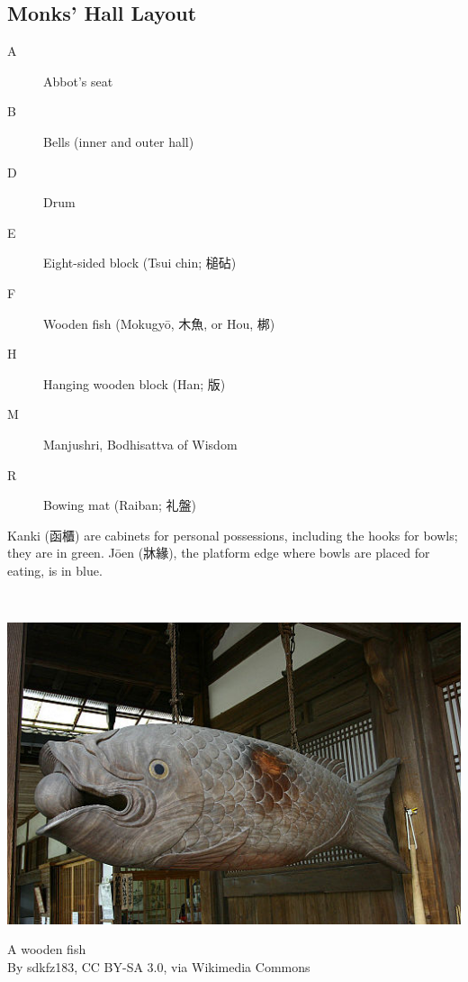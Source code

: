 \documentclass{article}
\begin{document}
\begin{multicols}{4}

\section{Monks' Hall Layout}

\begin{description}
\item[A] Abbot's seat
\item[B] Bells (inner and outer hall)
\item[D] Drum
\item[E] Eight-sided block (Tsui chin; 槌砧)
\item[F] Wooden fish (Mokugy\=o, 木魚, or Hou, 梆)
\item[H] Hanging wooden block (Han; 版)
\item[M] Manjushri, Bodhisattva of Wisdom
\item[R] Bowing mat (Raiban; 礼盤)
\end{description}

Kanki (函櫃) are cabinets for personal possessions, including the
hooks for bowls; they are in green. J\=oen (牀緣), the platform edge
where bowls are placed for eating, is in blue.

\columnbreak

~\vfill

\begin{center}
\includegraphics[width=\columnwidth]{Images/Wooden_plate.jpg}

{\small A wooden fish\\
\scriptsize By sdkfz183, CC BY-SA 3.0, via Wikimedia Commons\par}


\end{center}
\end{multicols}
\end{document}
